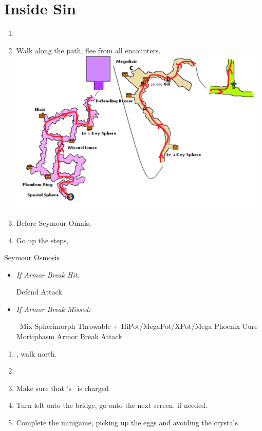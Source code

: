 \chapter{Inside Sin}
\begin{enumerate}
	\item \formation{\tidus}{\kimahri}{\auron}
	\item Walk along the path, flee from all encounters.
	\includegraphics{graphics/sinpath}
	\item Before Seymour Omnis, \formation{\tidus}{\yuna}{\auron}
	\item Go up the steps, \sd
\end{enumerate}
\begin{battle}[80000]{Seymour Osmosis}
\begin{itemize}
	\yunaf Defend
	\tidusf Armor Break
	\item \textit{If Armor Break Hit:}
	\begin{itemize}
		\auronf Defend
		\summon{\bahamut}
		\bahamutf Attack
	\end{itemize}
	\item \textit{If Armor Break Missed:}
	\begin{itemize}
		\switch{\auronf}{\rikku}
		\rikkuf \od\ Mix Spherimorph Throwable + HiPot/MegaPot/XPot/Mega Phoenix
		\yunaf Cure Mortiphasm
		\tidusf Armor Break
		\summon{\bahamut}
		\bahamutf Attack
	\end{itemize}
\end{itemize}
\end{battle}
\begin{enumerate}
	\item \sd, walk north.
	\item \formation{\tidus}{\kimahri}{\auron}
	\item Make sure that \rikku's \od\ is charged
	\item Turn left onto the bridge, go onto the next screen. \save if needed.
	\item Complete the minigame, picking up the eggs and avoiding the crystals.
\end{enumerate}

